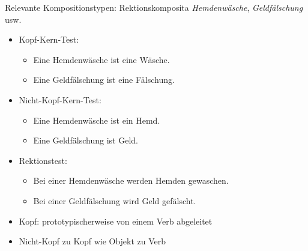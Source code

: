 \begin{frame}
  {Relevante Kompositionstypen: Rektionskomposita}
  \pause
  \textit{Hemdenwäsche}, \textit{Geldfälschung} usw.
  \pause
  \Halbzeile
  \begin{itemize}[<+->]
    \item Kopf-Kern-Test:
      \begin{itemize}[<+->]
        \item Eine Hemdenwäsche ist eine Wäsche. \Ck
        \item Eine Geldfälschung ist eine Fälschung. \Ck
      \end{itemize}
    \item Nicht-Kopf-Kern-Test:
      \begin{itemize}[<+->]
        \item Eine Hemdenwäsche ist ein Hemd. \Fl
        \item Eine Geldfälschung ist Geld. \Fl
      \end{itemize}
      \Halbzeile
    \item Rektionstest:
      \begin{itemize}[<+->]
        \item \alert{Bei einer Hemdenwäsche werden Hemden gewaschen. \Ck}
        \item \alert{Bei einer Geldfälschung wird Geld gefälscht. \Ck}
      \end{itemize}
      \Halbzeile
    \item Kopf: prototypischerweise von einem Verb abgeleitet
    \item Nicht-Kopf zu Kopf wie Objekt zu Verb
  \end{itemize}
\end{frame}

